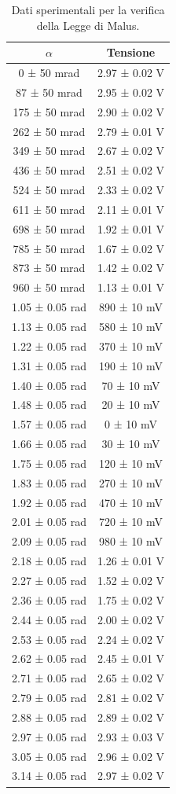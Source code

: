 \documentclass[a4paper]{article}
\begin{document}
\begin{table}[htbp]
\centering
\begin{tabular}{|c|c|}
\hline
$\alpha$ & Tensione \\\hline\hline
0 ± 50 mrad & 2.97 ± 0.02 V \\
87 ± 50 mrad & 2.95 ± 0.02 V \\
175 ± 50 mrad & 2.90 ± 0.02 V \\
262 ± 50 mrad & 2.79 ± 0.01 V \\
349 ± 50 mrad & 2.67 ± 0.02 V \\
436 ± 50 mrad & 2.51 ± 0.02 V \\
524 ± 50 mrad & 2.33 ± 0.02 V \\
611 ± 50 mrad & 2.11 ± 0.01 V \\
698 ± 50 mrad & 1.92 ± 0.01 V \\
785 ± 50 mrad & 1.67 ± 0.02 V \\
873 ± 50 mrad & 1.42 ± 0.02 V \\
960 ± 50 mrad & 1.13 ± 0.01 V \\
1.05 ± 0.05 rad & 890 ± 10 mV \\
1.13 ± 0.05 rad & 580 ± 10 mV \\
1.22 ± 0.05 rad & 370 ± 10 mV \\
1.31 ± 0.05 rad & 190 ± 10 mV \\
1.40 ± 0.05 rad & 70 ± 10 mV \\
1.48 ± 0.05 rad & 20 ± 10 mV \\
1.57 ± 0.05 rad & 0 ± 10 mV \\
1.66 ± 0.05 rad & 30 ± 10 mV \\
1.75 ± 0.05 rad & 120 ± 10 mV \\
1.83 ± 0.05 rad & 270 ± 10 mV \\
1.92 ± 0.05 rad & 470 ± 10 mV \\
2.01 ± 0.05 rad & 720 ± 10 mV \\
2.09 ± 0.05 rad & 980 ± 10 mV \\
2.18 ± 0.05 rad & 1.26 ± 0.01 V \\
2.27 ± 0.05 rad & 1.52 ± 0.02 V \\
2.36 ± 0.05 rad & 1.75 ± 0.02 V \\
2.44 ± 0.05 rad & 2.00 ± 0.02 V \\
2.53 ± 0.05 rad & 2.24 ± 0.02 V \\
2.62 ± 0.05 rad & 2.45 ± 0.01 V \\
2.71 ± 0.05 rad & 2.65 ± 0.02 V \\
2.79 ± 0.05 rad & 2.81 ± 0.02 V \\
2.88 ± 0.05 rad & 2.89 ± 0.02 V \\
2.97 ± 0.05 rad & 2.93 ± 0.03 V \\
3.05 ± 0.05 rad & 2.96 ± 0.02 V \\
3.14 ± 0.05 rad & 2.97 ± 0.02 V \\
\hline
\end{tabular}
\caption{Dati sperimentali per la verifica della Legge di Malus.}
\label{tab:dati_Malus}
\end{table}
\end{document}
